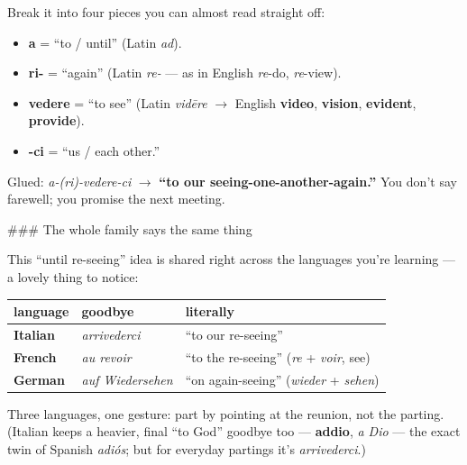 \begin{cousinweb}
Break it into four pieces you can almost read straight off:

\begin{itemize}
\raggedright
  \item \textbf{a} = \textquotedblleft{}to / until\textquotedblright{} (Latin \emph{ad}).
  \item \textbf{ri-} = \textquotedblleft{}again\textquotedblright{} (Latin \emph{re-} — as in English \emph{re}-do, \emph{re}-view).
  \item \textbf{vedere} = \textquotedblleft{}to see\textquotedblright{} (Latin \emph{vidēre} $\to$ English \textbf{video}, \textbf{vision}, \textbf{evident}, \textbf{provide}).
  \item \textbf{-ci} = \textquotedblleft{}us / each other.\textquotedblright{}
\end{itemize}

Glued: \emph{a-(ri)-vedere-ci} $\to$ \textbf{\textquotedblleft{}to our seeing-one-another-again.\textquotedblright{}} You don't say farewell; you promise the next meeting.

\#\#\# The whole family says the same thing

This \textquotedblleft{}until re-seeing\textquotedblright{} idea is shared right across the languages you're learning — a lovely thing to notice:

\noindent
\begin{tabularx}{\linewidth}{@{}>{\raggedright\arraybackslash}X>{\raggedright\arraybackslash}X>{\raggedright\arraybackslash}X@{}}
\toprule
\textbf{language} & \textbf{goodbye} & \textbf{literally} \\
\midrule
\textbf{Italian} & \emph{arrivederci} & \textquotedblleft{}to our re-seeing\textquotedblright{} \\
\textbf{French} & \emph{au revoir} & \textquotedblleft{}to the re-seeing\textquotedblright{} (\emph{re} + \emph{voir}, see) \\
\textbf{German} & \emph{auf Wiedersehen} & \textquotedblleft{}on again-seeing\textquotedblright{} (\emph{wieder} + \emph{sehen}) \\
\bottomrule
\end{tabularx}

Three languages, one gesture: part by pointing at the reunion, not the parting. (Italian keeps a heavier, final \textquotedblleft{}to God\textquotedblright{} goodbye too — \textbf{addio}, \emph{a Dio} — the exact twin of Spanish \emph{adiós}; but for everyday partings it's \emph{arrivederci}.)
\end{cousinweb}

